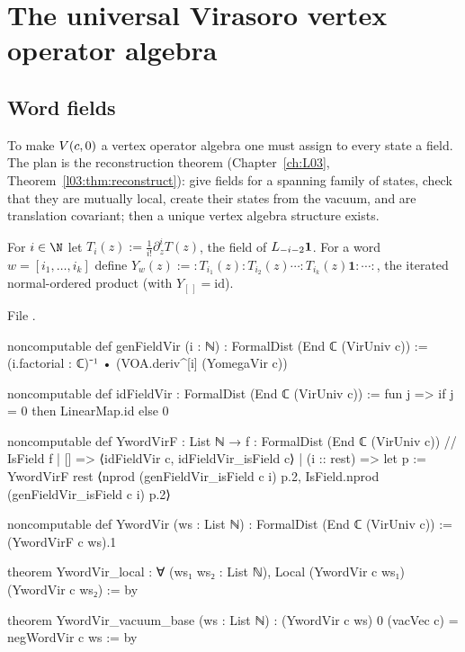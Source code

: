 \section{The universal Virasoro vertex operator algebra}\label{l06:sec:voa}

\subsection{Word fields}

To make $V(c,0)$ a vertex operator algebra one must assign to every state a field. The plan is the
reconstruction theorem (Chapter~\ref{ch:L03}, Theorem~\ref{l03:thm:reconstruct}):
give fields for a spanning family of states, check that they are mutually local, create their states
from the vacuum, and are translation covariant; then a unique vertex algebra structure exists.

\begin{definition}\label{l06:def:wordfields}
For $i\in\N$ let $T_i(z) := \frac{1}{i!}\partial_z^iT(z)$, the field of $L_{-i-2}\mathbf{1}$. For a word
$w = [i_1,\dots,i_k]$ define $Y_w(z) := {:}T_{i_1}(z){:}T_{i_2}(z)\cdots{:}T_{i_k}(z)\mathbf{1}{:}\cdots{:}$, the
iterated normal-ordered product (with $Y_{[\,]} = \mathrm{id}$).
\end{definition}

File .
\begin{leancode}
noncomputable def genFieldVir (i : ℕ) : FormalDist (End ℂ (VirUniv c)) :=
  (i.factorial : ℂ)⁻¹ • (VOA.deriv^[i] (YomegaVir c))

noncomputable def idFieldVir : FormalDist (End ℂ (VirUniv c)) :=
  fun j => if j = 0 then LinearMap.id else 0

noncomputable def YwordVirF :
    List ℕ → { f : FormalDist (End ℂ (VirUniv c)) // IsField f }
  | [] => ⟨idFieldVir c, idFieldVir_isField c⟩
  | (i :: rest) =>
      let p := YwordVirF rest
      ⟨nprod (genFieldVir_isField c i) p.2, IsField.nprod (genFieldVir_isField c i) p.2⟩

noncomputable def YwordVir (ws : List ℕ) : FormalDist (End ℂ (VirUniv c)) := (YwordVirF c ws).1

theorem YwordVir_local : ∀ (ws₁ ws₂ : List ℕ), Local (YwordVir c ws₁) (YwordVir c ws₂) := by

theorem YwordVir_vacuum_base (ws : List ℕ) :
    (YwordVir c ws) 0 (vacVec c) = negWordVir c ws := by
\end{leancode}

